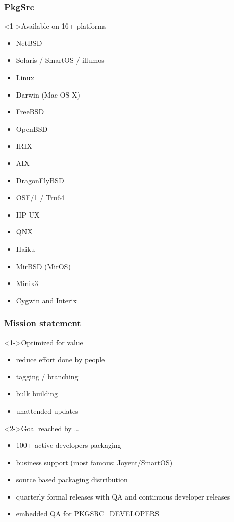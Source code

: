 \documentclass[ngerman,xcolor={table,dvipsnames},smaller,compress,hyperref={bookmarks,colorlinks}]{beamer}
\begin{document}
\begin{frame}[fragile]
\frametitle{PkgSrc}
\scriptsize
\begin{block}<1->{Available on 16+ platforms}
\begin{itemize}
\item NetBSD
\item Solaris / SmartOS / illumos
\item Linux
\item Darwin (Mac OS X)
\item FreeBSD
\item OpenBSD
\item IRIX
\item AIX
\item DragonFlyBSD
\item OSF/1 / Tru64
\item HP-UX
\item QNX
\item Haiku
\item MirBSD (MirOS)
\item Minix3
\item Cygwin and Interix
\end{itemize}
\end{block}
\end{frame}

\begin{frame}[fragile]
\frametitle{Mission statement}
\begin{block}<1->{Optimized for value}
\begin{itemize}
\item reduce effort done by people
\item tagging / branching
\item bulk building
\item unattended updates
\end{itemize}
\end{block}

\begin{block}<2->{Goal reached by \ldots}
\begin{itemize}
\item 100+ active developers packaging
\item business support (most famous: Joyent/SmartOS)
\item source based packaging distribution
\item quarterly formal releases with QA and continuous developer releases
\item embedded QA for PKGSRC\_DEVELOPERS
\end{itemize}
\end{block}
\end{frame}
\end{document}
